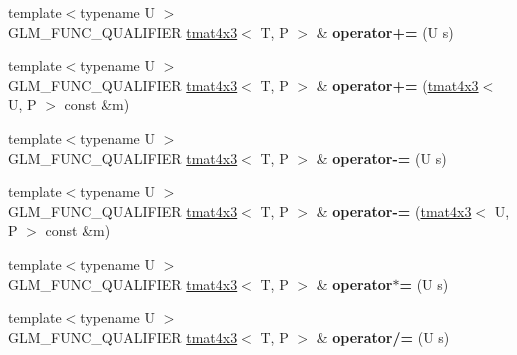 \begin{DoxyCompactItemize}
\item 
{\footnotesize template$<$typename U $>$ }\\G\+L\+M\+\_\+\+F\+U\+N\+C\+\_\+\+Q\+U\+A\+L\+I\+F\+I\+ER \hyperlink{structglm_1_1detail_1_1tmat4x3}{tmat4x3}$<$ T, P $>$ \& {\bfseries operator+=} (U s)\hypertarget{structglm_1_1detail_1_1tmat4x3_a4ad2b7cf1ca8473d377b1a6bfbdb7f53}{}\label{structglm_1_1detail_1_1tmat4x3_a4ad2b7cf1ca8473d377b1a6bfbdb7f53}

\item 
{\footnotesize template$<$typename U $>$ }\\G\+L\+M\+\_\+\+F\+U\+N\+C\+\_\+\+Q\+U\+A\+L\+I\+F\+I\+ER \hyperlink{structglm_1_1detail_1_1tmat4x3}{tmat4x3}$<$ T, P $>$ \& {\bfseries operator+=} (\hyperlink{structglm_1_1detail_1_1tmat4x3}{tmat4x3}$<$ U, P $>$ const \&m)\hypertarget{structglm_1_1detail_1_1tmat4x3_af8c2c8f9977ae873d3c26b5027363fcf}{}\label{structglm_1_1detail_1_1tmat4x3_af8c2c8f9977ae873d3c26b5027363fcf}

\item 
{\footnotesize template$<$typename U $>$ }\\G\+L\+M\+\_\+\+F\+U\+N\+C\+\_\+\+Q\+U\+A\+L\+I\+F\+I\+ER \hyperlink{structglm_1_1detail_1_1tmat4x3}{tmat4x3}$<$ T, P $>$ \& {\bfseries operator-\/=} (U s)\hypertarget{structglm_1_1detail_1_1tmat4x3_af3a1782be12d9d822cc6fc21b94fe319}{}\label{structglm_1_1detail_1_1tmat4x3_af3a1782be12d9d822cc6fc21b94fe319}

\item 
{\footnotesize template$<$typename U $>$ }\\G\+L\+M\+\_\+\+F\+U\+N\+C\+\_\+\+Q\+U\+A\+L\+I\+F\+I\+ER \hyperlink{structglm_1_1detail_1_1tmat4x3}{tmat4x3}$<$ T, P $>$ \& {\bfseries operator-\/=} (\hyperlink{structglm_1_1detail_1_1tmat4x3}{tmat4x3}$<$ U, P $>$ const \&m)\hypertarget{structglm_1_1detail_1_1tmat4x3_ae99d5b3f57c8ba0e43b95d50c3652e14}{}\label{structglm_1_1detail_1_1tmat4x3_ae99d5b3f57c8ba0e43b95d50c3652e14}

\item 
{\footnotesize template$<$typename U $>$ }\\G\+L\+M\+\_\+\+F\+U\+N\+C\+\_\+\+Q\+U\+A\+L\+I\+F\+I\+ER \hyperlink{structglm_1_1detail_1_1tmat4x3}{tmat4x3}$<$ T, P $>$ \& {\bfseries operator$\ast$=} (U s)\hypertarget{structglm_1_1detail_1_1tmat4x3_a2a6ffe1017bd2b4d1b74d45d8d90e90e}{}\label{structglm_1_1detail_1_1tmat4x3_a2a6ffe1017bd2b4d1b74d45d8d90e90e}

\item 
{\footnotesize template$<$typename U $>$ }\\G\+L\+M\+\_\+\+F\+U\+N\+C\+\_\+\+Q\+U\+A\+L\+I\+F\+I\+ER \hyperlink{structglm_1_1detail_1_1tmat4x3}{tmat4x3}$<$ T, P $>$ \& {\bfseries operator/=} (U s)\hypertarget{structglm_1_1detail_1_1tmat4x3_a990634b567ee79dbd2cfc3ea469e57fb}{}\label{structglm_1_1detail_1_1tmat4x3_a990634b567ee79dbd2cfc3ea469e57fb}

\end{DoxyCompactItemize}


